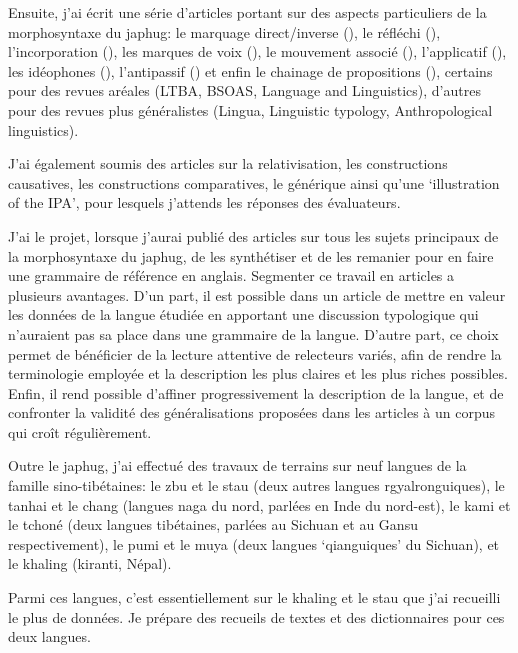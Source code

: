 \documentclass[oldfontcommands,oneside,a4paper,11pt]{article}
\begin{document}
Ensuite, j'ai écrit une série d'articles portant sur des aspects particuliers de la morphosyntaxe du japhug: le marquage direct/inverse (\citealt{jacques10inverse}), le réfléchi (\citealt{jacques10refl}), l'incorporation  (\citealt{jacques12incorp}), les marques de voix (\citealt{jacques12demotion}),  le mouvement associé (\citealt{jacques13harmonization}), l'applicatif (\citealt{jacques13tropative}), les idéophones (\citealt{japhug14ideophones}), l'antipassif (\citealt{jacques14antipassive}) et enfin le chainage de propositions  (\citealt{jacques14linking}), certains pour des revues aréales (LTBA, BSOAS, Language and Linguistics), d'autres pour des revues plus généralistes (Lingua, Linguistic typology, Anthropological linguistics). 

J'ai également soumis des articles sur la relativisation, les constructions causatives, les constructions comparatives, le générique ainsi qu'une `illustration of the IPA', pour lesquels j'attends les réponses des évaluateurs. 

J'ai le projet, lorsque j'aurai publié des articles sur tous les sujets principaux de la morphosyntaxe du japhug, de les synthétiser et de les remanier pour en faire une grammaire de référence en anglais. Segmenter ce travail en articles a plusieurs avantages. D'un part, il est possible dans un article de mettre en valeur les données de la langue étudiée en apportant une discussion typologique qui n'auraient pas sa place dans une grammaire de la langue. D'autre part, ce choix permet de bénéficier de la lecture attentive de relecteurs variés, afin de rendre la terminologie employée et la description les plus claires et les plus riches possibles. Enfin, il rend possible d'affiner progressivement la description de la langue, et de confronter la validité des généralisations proposées dans les articles à un corpus qui croît régulièrement. 

Outre le japhug, j'ai effectué des travaux de terrains sur neuf langues de la famille sino-tibétaines: le zbu et le stau (deux autres langues rgyalronguiques), le tanhai et le chang (langues naga du nord, parlées en Inde du nord-est), le kami et le tchoné (deux langues tibétaines, parlées au Sichuan et au Gansu respectivement), le pumi et le muya (deux langues `qianguiques' du Sichuan), et le khaling (kiranti, Népal).

Parmi ces langues, c'est essentiellement sur le khaling et le stau que j'ai recueilli le plus de données. Je prépare des recueils de textes et des  dictionnaires pour ces deux langues.
\end{document}
